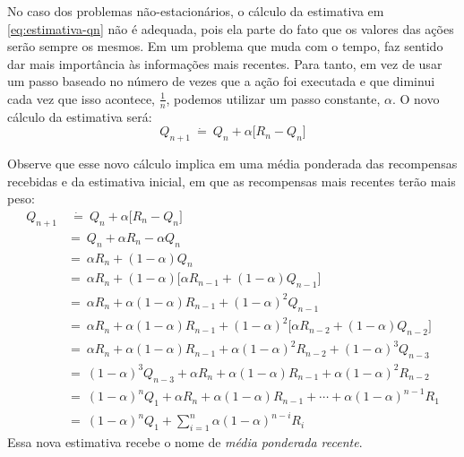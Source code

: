 \documentclass{article}
\begin{document}
        No caso dos problemas não-estacionários, o cálculo da estimativa em \eqref{eq:estimativa-qn} não é adequada, pois ela parte do fato que os valores das ações serão sempre os mesmos. Em um problema que muda com o tempo, faz sentido dar mais importância às informações mais recentes. Para tanto, em vez de usar um passo baseado no número de vezes que a ação foi executada e que diminui cada vez que isso acontece, $\frac{1}{n}$, podemos utilizar um passo constante, $\alpha$. O novo cálculo da estimativa será:
        \begin{equation}
            Q_{n+1} \ \dot{=} \ Q_n + \alpha \Big[ R_n - Q_n \Big]
        \end{equation}

        Observe que esse novo cálculo implica em uma média ponderada das recompensas recebidas e da estimativa inicial, em que as recompensas mais recentes terão mais peso:
        \begin{subequations}
        \begin{align}
            Q_{n+1} & \ \dot{=} \ Q_n + \alpha \Big[ R_n - Q_n \Big] \nonumber\\
            & = \ Q_n + \alpha R_n - \alpha Q_n \nonumber\\
            & = \ \alpha R_n + (1 - \alpha) Q_n \nonumber\\
            & = \ \alpha R_n + (1 - \alpha) \Big[ \alpha R_{n-1} + (1 - \alpha) Q_{n-1} \Big] \nonumber\\
            & = \ \alpha R_n + \alpha (1 - \alpha) R_{n-1} + (1 - \alpha)^2 Q_{n-1} \nonumber\\
            & = \ \alpha R_n + \alpha (1 - \alpha) R_{n-1} + (1 - \alpha)^2 \Big[ \alpha R_{n-2} + (1 - \alpha) Q_{n-2} \Big] \nonumber\\
            & = \ \alpha R_n + \alpha (1 - \alpha) R_{n-1} + \alpha (1 - \alpha)^2 R_{n-2} + (1 - \alpha)^3 Q_{n-3} \nonumber\\
            & = \ (1 - \alpha)^3 Q_{n-3} + \alpha R_n + \alpha (1 - \alpha) R_{n-1} + \alpha (1 - \alpha)^2 R_{n-2} \nonumber\\
            & = \ (1 - \alpha)^n Q_1 + \alpha R_n + \alpha (1 - \alpha) R_{n-1} + \cdots + \alpha (1 - \alpha)^{n-1} R_1 \nonumber\\
            & = \ (1 - \alpha)^n Q_1 + \sum_{i=1}^{n} \alpha (1 - \alpha)^{n - i} R_i
        \end{align}
        \end{subequations}
        Essa nova estimativa recebe o nome de \emph{média ponderada recente}.
        
\end{document}
